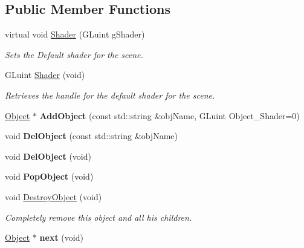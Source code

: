 \subsection*{Public Member Functions}
\begin{DoxyCompactItemize}
\item 
virtual void \hyperlink{class_scene_a7137a7302c21ac4dd44e746bfb6f7cf8}{Shader} (G\-Luint g\-Shader)
\begin{DoxyCompactList}\small\item\em Sets the Default shader for the scene. \end{DoxyCompactList}\item 
G\-Luint \hyperlink{class_scene_af1e8ba8802f3bf83cebbfcbf3ed7c333}{Shader} (void)
\begin{DoxyCompactList}\small\item\em Retrieves the handle for the default shader for the scene. \end{DoxyCompactList}\item 
\hypertarget{class_scene_a366b5dec1ecf66a887b4d0dedcd1aa3b}{\hyperlink{class_object}{Object} $\ast$ {\bfseries Add\-Object} (const std\-::string \&obj\-Name, G\-Luint Object\-\_\-\-Shader=0)}\label{class_scene_a366b5dec1ecf66a887b4d0dedcd1aa3b}

\item 
\hypertarget{class_scene_a3bd9fa1058f506c04162b9283e97d20e}{void {\bfseries Del\-Object} (const std\-::string \&obj\-Name)}\label{class_scene_a3bd9fa1058f506c04162b9283e97d20e}

\item 
\hypertarget{class_scene_a43fd3c56db5dc940d1724b9573c9a360}{void {\bfseries Del\-Object} (void)}\label{class_scene_a43fd3c56db5dc940d1724b9573c9a360}

\item 
\hypertarget{class_scene_abdfd15e7987aa261840d5ecc265170df}{void {\bfseries Pop\-Object} (void)}\label{class_scene_abdfd15e7987aa261840d5ecc265170df}

\item 
\hypertarget{class_scene_a82759ded1f6f87a91b8d10ed87501958}{void \hyperlink{class_scene_a82759ded1f6f87a91b8d10ed87501958}{Destroy\-Object} (void)}\label{class_scene_a82759ded1f6f87a91b8d10ed87501958}

\begin{DoxyCompactList}\small\item\em Completely remove this object and all his children. \end{DoxyCompactList}\item 
\hypertarget{class_scene_a70fcdad192a4c6ff508125de8af6cf4d}{\hyperlink{class_object}{Object} $\ast$ {\bfseries next} (void)}\label{class_scene_a70fcdad192a4c6ff508125de8af6cf4d}


\end{DoxyCompactItemize}
